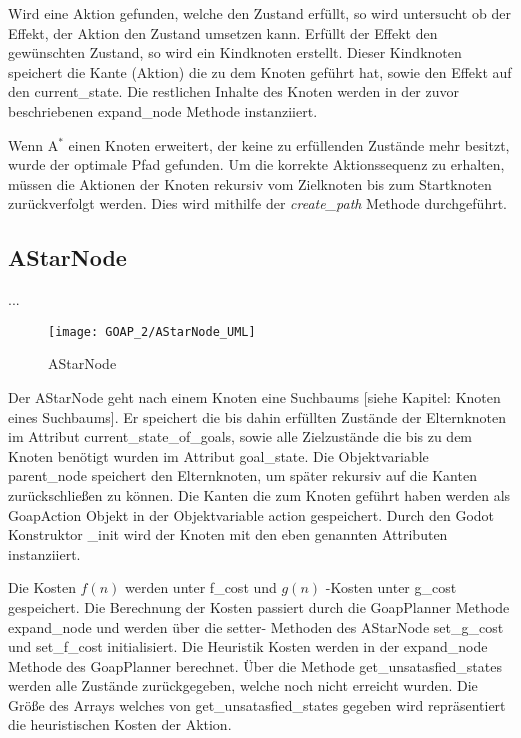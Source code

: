 Wird eine Aktion gefunden, welche den Zustand erfüllt, so wird untersucht ob der Effekt, der Aktion den Zustand umsetzen kann. Erfüllt der Effekt den gewünschten Zustand, so wird ein Kindknoten erstellt. Dieser Kindknoten speichert die Kante (Aktion) die zu dem Knoten geführt hat, sowie den Effekt auf den current\_state. Die restlichen Inhalte des Knoten werden in der zuvor beschriebenen expand\_node Methode instanziiert.



Wenn A$^*$ einen Knoten erweitert, der keine zu erfüllenden Zustände mehr besitzt, wurde der optimale Pfad gefunden. Um die korrekte Aktionssequenz zu erhalten, müssen die Aktionen der Knoten rekursiv vom Zielknoten bis zum Startknoten zurückverfolgt werden. Dies wird mithilfe der \textit{create\_path} Methode durchgeführt.



\subsection{AStarNode}

...

\begin{figure}[h]
  \centering
  \texttt{[image: GOAP\_2/AStarNode\_UML]}
	\captionsetup{justification=justified, format=plain}
  \caption{AStarNode}
  \label{AStarNode}
\end{figure}

Der AStarNode geht nach einem Knoten eine Suchbaums [siehe Kapitel: Knoten eines Suchbaums]. Er speichert die bis dahin erfüllten Zustände der Elternknoten im Attribut current\_state\_of\_goals, sowie alle Zielzustände die bis zu dem Knoten benötigt wurden im Attribut goal\_state. Die Objektvariable parent\_node speichert den Elternknoten, um später rekursiv auf die Kanten zurückschließen zu können. Die Kanten die zum Knoten geführt haben werden als GoapAction Objekt in der Objektvariable action gespeichert. Durch den Godot Konstruktor \_init wird der Knoten mit den eben genannten Attributen instanziiert.

Die Kosten $f(n)$ werden unter f\_cost und $g(n)$ -Kosten unter g\_cost gespeichert. Die Berechnung der Kosten passiert durch die GoapPlanner Methode expand\_node und werden über die setter- Methoden des AStarNode set\_g\_cost und set\_f\_cost initialisiert. Die Heuristik Kosten werden in der expand\_node Methode des GoapPlanner berechnet. Über die Methode get\_unsatasfied\_states werden alle Zustände zurückgegeben, welche noch nicht erreicht wurden. Die Größe des Arrays welches von get\_unsatasfied\_states gegeben wird repräsentiert die heuristischen Kosten der Aktion.

